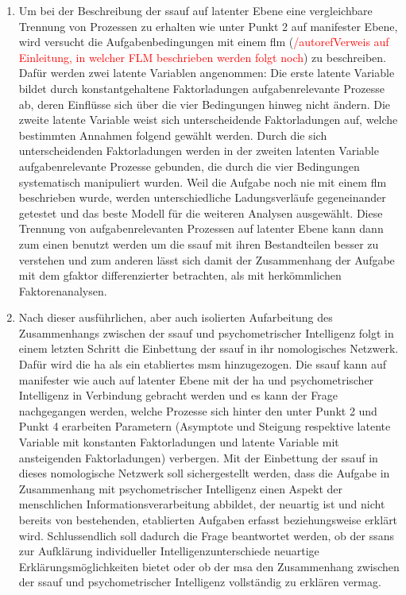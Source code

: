 \documentclass[11pt, twoside, a4paper]{book}		%
\begin{document}
\begin{enumerate}
	\item Um bei der Beschreibung der \gls{ssauf} auf latenter Ebene eine vergleichbare Trennung von Prozessen zu erhalten wie unter Punkt 2 auf manifester Ebene, wird versucht die Aufgabenbedingungen mit einem \gls{flm} (\textcolor{red}{/autoref{Verweis auf Einleitung, in welcher FLM beschrieben werden folgt noch}}) zu beschreiben. 
	Dafür werden zwei latente Variablen angenommen: Die erste latente Variable bildet durch konstantgehaltene Faktorladungen aufgabenrelevante Prozesse ab, deren Einflüsse sich über die vier Bedingungen hinweg nicht ändern. 
	Die zweite latente Variable weist sich unterscheidende Faktorladungen auf, welche  bestimmten Annahmen folgend gewählt werden.
	Durch die sich unterscheidenden Faktorladungen werden in der zweiten latenten Variable aufgabenrelevante Prozesse gebunden, die durch die vier Bedingungen systematisch manipuliert wurden. Weil die Aufgabe noch nie mit einem \gls{flm} beschrieben wurde, werden unterschiedliche Ladungsverläufe gegeneinander getestet und das beste Modell für die weiteren Analysen ausgewählt.
	Diese Trennung von aufgabenrelevanten Prozessen auf latenter Ebene kann dann zum einen benutzt werden um die \gls{ssauf} mit ihren Bestandteilen besser zu verstehen und zum anderen lässt sich damit der Zusammenhang  der Aufgabe mit dem \gls{gfaktor} differenzierter betrachten, als mit herkömmlichen Faktorenanalysen.

	\item Nach dieser ausführlichen, aber auch isolierten Aufarbeitung des Zusammenhangs zwischen der \gls{ssauf} und psychometrischer Intelligenz folgt in einem letzten Schritt die Einbettung der \gls{ssauf} in ihr nomologisches Netzwerk. Dafür wird die \gls{ha} als ein etabliertes \gls{msm} hinzugezogen. Die \gls{ssauf} kann auf manifester wie auch auf latenter Ebene mit der \gls{ha} und psychometrischer Intelligenz in Verbindung gebracht werden und es kann der Frage nachgegangen werden, welche Prozesse sich hinter den unter Punkt 2 und Punkt 4 erarbeiten Parametern (Asymptote und Steigung respektive latente Variable mit konstanten Faktorladungen und latente Variable mit ansteigenden Faktorladungen) verbergen. Mit der Einbettung der \gls{ssauf} in dieses nomologische Netzwerk soll sichergestellt werden, dass die Aufgabe in Zusammenhang mit psychometrischer Intelligenz einen Aspekt der menschlichen Informationsverarbeitung abbildet, der neuartig ist und nicht bereits von bestehenden, etablierten Aufgaben erfasst beziehungsweise erklärt wird. Schlussendlich soll dadurch die Frage beantwortet werden, ob der \gls{ssans} zur Aufklärung individueller Intelligenzunterschiede neuartige Erklärungsmöglichkeiten bietet oder ob der \gls{msa} den Zusammenhang zwischen der \gls{ssauf} und psychometrischer Intelligenz vollständig zu erklären vermag.

\end{enumerate}
\end{document}
